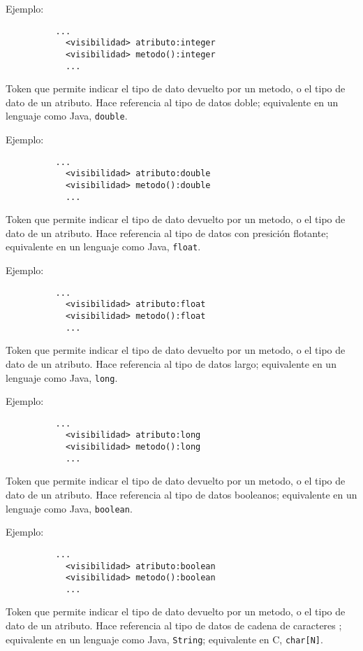 \begin{description}[align=right,labelwidth=2.5cm]
	Ejemplo:
		\begin{lstlisting}
		  ...
			<visibilidad> atributo:integer
			<visibilidad> metodo():integer
			...
		\end{lstlisting}

\item [double] Token que permite indicar el tipo de dato devuelto por un metodo, o
	el tipo de dato de un atributo. Hace referencia al tipo de
	datos doble; equivalente en un lenguaje como Java, \texttt{double}.

	Ejemplo:
		\begin{lstlisting}
		  ...
			<visibilidad> atributo:double
			<visibilidad> metodo():double
			...
		\end{lstlisting}

\item [float] Token que permite indicar el tipo de dato devuelto por un metodo, o
	el tipo de dato de un atributo. Hace referencia al tipo de
	datos con presición flotante; equivalente en un lenguaje como Java,
	\texttt{float}.

	Ejemplo:
		\begin{lstlisting}
		  ...
			<visibilidad> atributo:float
			<visibilidad> metodo():float
			...
		\end{lstlisting}

\item [long] Token que permite indicar el tipo de dato devuelto por un metodo, o
	el tipo de dato de un atributo. Hace referencia al tipo de
	datos largo; equivalente en un lenguaje como Java, \texttt{long}.

	Ejemplo:
		\begin{lstlisting}
		  ...
			<visibilidad> atributo:long
			<visibilidad> metodo():long
			...
		\end{lstlisting}

\item [boolean] Token que permite indicar el tipo de dato devuelto por un metodo, o
	el tipo de dato de un atributo. Hace referencia al tipo de
	datos booleanos; equivalente en un lenguaje como Java, \texttt{boolean}.

	Ejemplo:
		\begin{lstlisting}
		  ...
			<visibilidad> atributo:boolean
			<visibilidad> metodo():boolean
			...
		\end{lstlisting}

\item [string] Token que permite indicar el tipo de dato devuelto por un metodo, o
	el tipo de dato de un atributo. Hace referencia al tipo de
	datos de cadena de caracteres ; equivalente en un lenguaje como Java, \texttt{String};
	equivalente en C, \texttt{char[N]}.


\end{description}
